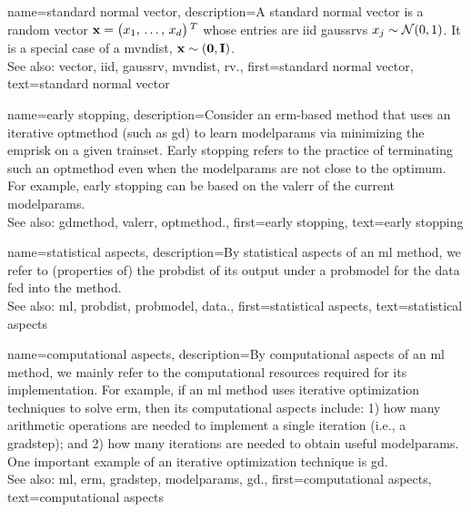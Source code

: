 {name={standard normal vector}, 
	description={A standard normal \gls{vector} is a random 
		\gls{vector} ${\bf x}=\big(x_{1}, \,\ldots, \,x_{d}\big)\,^{T}$ 
		whose entries are \gls{iid} \glspl{gaussrv} $x_{j} \sim \mathcal{N}(0,1)$. 
		It is a special case of a \gls{mvndist}, ${\bf x} \sim \mathcal(\mathbf{0},\mathbf{I})$.
		\\ 
		See also: \gls{vector}, \gls{iid}, \gls{gaussrv}, \gls{mvndist}, \gls{rv}.}, 
	first={standard normal vector},
	text={standard normal vector}
}

{name={early stopping}, 
	description={Consider an \gls{erm}-based method that uses an 
	iterative \gls{optmethod} (such as \gls{gd}) to learn \glspl{modelparam} 
	via minimizing the \gls{emprisk} on a given \gls{trainset}.
	Early stopping  refers to the practice of 
	terminating such an \gls{optmethod} even when the \glspl{modelparam} 
	are not close to the optimum. For example, early stopping can be 
	based on the \gls{valerr} of the current \glspl{modelparam}. 
					\\ 
		See also: \gls{gdmethod}, \gls{valerr}, \gls{optmethod}.},
	first={early stopping},
	text={early stopping}
}

{name={statistical aspects}, 
	description={By statistical aspects 
		of an \gls{ml} method, we refer to (properties of) the \gls{probdist} of its output 
		under a \gls{probmodel} for the \gls{data} fed into the method.
					\\ 
		See also: \gls{ml}, \gls{probdist}, \gls{probmodel}, \gls{data}.},
	first={statistical aspects},
	text={statistical aspects}
}

{name={computational aspects}, 
	description={By computational 
		aspects of an \gls{ml} method, we mainly refer to the computational 
		resources required for its implementation. For example, if an \gls{ml} method uses iterative 
		optimization techniques to solve \gls{erm}, then its computational aspects include: 1) how 
		many arithmetic operations are needed to implement a single iteration (i.e., a \gls{gradstep}); 
		and 2) how many iterations are needed to obtain useful \glspl{modelparam}. One important 
		example of an iterative optimization technique is \gls{gd}.
					\\ 
		See also: \gls{ml}, \gls{erm}, \gls{gradstep}, \glspl{modelparam}, \gls{gd}.}, 
	first={computational aspects},
	text={computational aspects}
}


